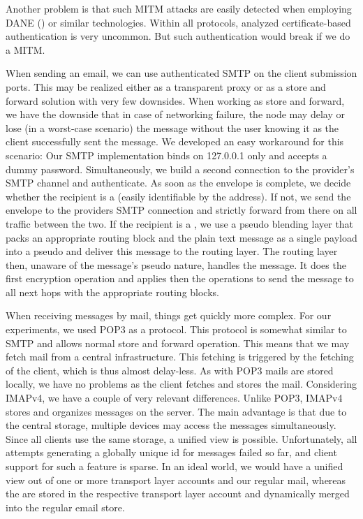 Another problem is that such MITM attacks are easily detected when employing DANE (\cite{rfc6698,rfc7672}) or similar technologies. Within all protocols, analyzed certificate-based authentication is very uncommon. But such authentication would break if we do a MITM.

When sending an email, we can use authenticated SMTP on the client submission ports. This may be realized either as a transparent proxy or as a store and forward solution with very few downsides. When working as store and forward, we have the downside that in case of networking failure, the node may delay or lose (in a worst-case scenario) the message without the user knowing it as the client successfully sent the message. We developed an easy workaround for this scenario: Our SMTP implementation binds on 127.0.0.1 only and accepts a dummy password. Simultaneously, we build a second connection to the provider's SMTP channel and authenticate. As soon as the envelope is complete, we decide whether the recipient is a \VortexNode{} (easily identifiable by the address).  If not, we send the envelope to the providers SMTP connection and strictly forward from there on all traffic between the two. If the recipient is a \VortexNode{}, we use a pseudo blending layer that packs an appropriate routing block and the plain text message as a single payload into a pseudo \VortexMessage{} and deliver this message to the routing layer. The routing layer then, unaware of the message's pseudo nature, handles the message. It does the first encryption operation and applies then the operations to send the message to all next hops with the appropriate routing blocks.

When receiving messages by mail, things get quickly more complex. For our experiments, we used POP3 as a protocol. This protocol is somewhat similar to SMTP and allows normal store and forward operation. This means that we may fetch mail from a central infrastructure. This fetching is triggered by the fetching of the client, which is thus almost delay-less. As with POP3 mails are stored locally, we have no problems as the client fetches and stores the mail. Considering IMAPv4, we have a couple of very relevant differences. Unlike POP3, IMAPv4 stores and organizes messages on the server. The main advantage is that due to the central storage, multiple devices may access the messages simultaneously. Since all clients use the same storage, a unified view is possible. Unfortunately, all attempts generating a globally unique id for messages failed so far, and client support for such a feature is sparse. In an ideal world, we would have a unified view out of one or more \MessageVortex{} transport layer accounts and our regular mail, whereas the \VortexMessages{} are stored in the respective transport layer account and dynamically merged into the regular email store. 

